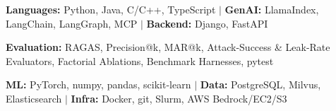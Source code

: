 \item\small{\textbf{Languages:} Python, Java, C/C++, TypeScript $|$ \textbf{GenAI:} LlamaIndex, LangChain, LangGraph, MCP $|$ \textbf{Backend:} Django, FastAPI}
\item\small{\textbf{Evaluation:} RAGAS, Precision@k, MAR@k, Attack-Success \& Leak-Rate Evaluators, Factorial Ablations, Benchmark Harnesses, pytest}
\item\small{\textbf{ML:} PyTorch, numpy, pandas, scikit-learn $|$ \textbf{Data:} PostgreSQL, Milvus, Elasticsearch $|$ \textbf{Infra:} Docker, git, Slurm, AWS Bedrock/EC2/S3}%
